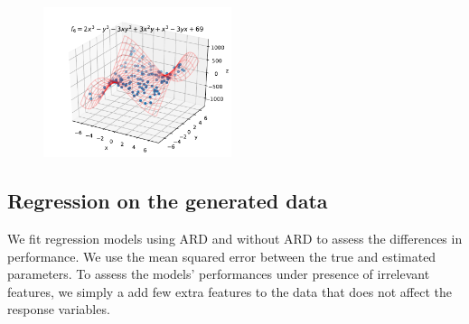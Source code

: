 \documentclass[12pt]{article}
\begin{document}
\begin{figure}[H]
            \includegraphics[width=0.49\textwidth]{f_6.pdf}
            \caption{}
        \end{figure}
    
    \subsection{Regression on the generated data}
        We fit regression models using ARD and without ARD to assess the differences in performance. We use the mean squared error between the true and estimated parameters. To assess the models' performances under presence of irrelevant features, we simply a add few extra features to the data that does not affect the response variables.
\end{document}
